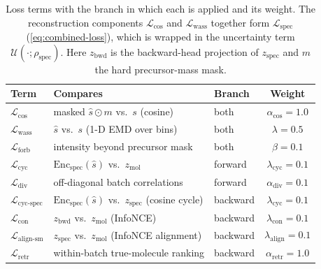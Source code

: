 \begin{table}[H]
    \centering
    \small
    \caption[Loss Terms]{Loss terms with the branch in which each is applied and its weight.
    The reconstruction components $\mathcal{L}_{\cos}$ and $\mathcal{L}_{\mathrm{wass}}$ together form $\mathcal{L}_{\mathrm{spec}}$ (\cref{eq:combined-loss}), which is wrapped in the uncertainty term $\mathcal{U}(\cdot;\rho_{\mathrm{spec}})$.
    Here $z_{\mathrm{bwd}}$ is the backward-head projection of $z_{\mathrm{spec}}$ and $m$ the hard precursor-mass mask.}
    \label{tab:loss-terms}
    \begin{tabular}{lllc}
        \hline
        Term & Compares & Branch & Weight \\
        \hline
        $\mathcal{L}_{\cos}$            & masked $\hat{s}\odot m$ vs.\ $s$ (cosine)                       & both     & $\alpha_{\cos}=1.0$ \\
        $\mathcal{L}_{\mathrm{wass}}$   & $\hat{s}$ vs.\ $s$ (1-D EMD over bins)                          & both     & $\lambda=0.5$ \\
        $\mathcal{L}_{\mathrm{forb}}$   & intensity beyond precursor mask                                 & both     & $\beta=0.1$ \\
        $\mathcal{L}_{\mathrm{cyc}}$    & $\mathrm{Enc}_{\mathrm{spec}}(\hat{s})$ vs.\ $z_{\mathrm{mol}}$  & forward  & $\lambda_{\mathrm{cyc}}=0.1$ \\
        $\mathcal{L}_{\mathrm{div}}$    & off-diagonal batch correlations                                 & forward  & $\alpha_{\mathrm{div}}=0.1$ \\
        $\mathcal{L}_{\text{cyc-spec}}$ & $\mathrm{Enc}_{\mathrm{spec}}(\hat{s})$ vs.\ $z_{\mathrm{spec}}$ (cosine cycle) & backward & $\lambda_{\mathrm{cyc}}=0.1$ \\
        $\mathcal{L}_{\mathrm{con}}$    & $z_{\mathrm{bwd}}$ vs.\ $z_{\mathrm{mol}}$ (InfoNCE)            & backward & $\lambda_{\mathrm{con}}=0.1$ \\
        $\mathcal{L}_{\text{align-sm}}$ & $z_{\mathrm{spec}}$ vs.\ $z_{\mathrm{mol}}$ (InfoNCE alignment)  & backward & $\lambda_{\text{align}}=0.1$ \\
        $\mathcal{L}_{\mathrm{retr}}$   & within-batch true-molecule ranking                              & backward & $\alpha_{\mathrm{retr}}=1.0$ \\
        \hline
    \end{tabular}
\end{table}

